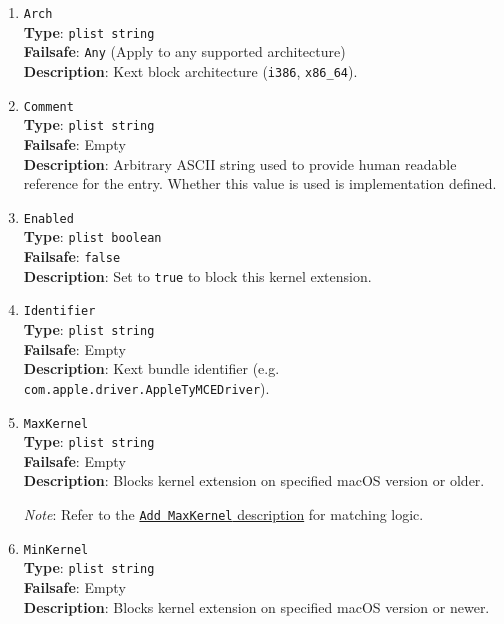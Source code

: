 \documentclass[]{article}
\begin{document}
\begin{enumerate}

\item
  \texttt{Arch}\\
  \textbf{Type}: \texttt{plist\ string}\\
  \textbf{Failsafe}: \texttt{Any} (Apply to any supported architecture)\\
  \textbf{Description}: Kext block architecture (\texttt{i386}, \texttt{x86\_64}).

\item
  \texttt{Comment}\\
  \textbf{Type}: \texttt{plist\ string}\\
  \textbf{Failsafe}: Empty\\
  \textbf{Description}: Arbitrary ASCII string used to provide human readable
  reference for the entry. Whether this value is used is implementation defined.

\item
  \texttt{Enabled}\\
  \textbf{Type}: \texttt{plist\ boolean}\\
  \textbf{Failsafe}: \texttt{false}\\
  \textbf{Description}: Set to \texttt{true} to block this kernel extension.

\item
  \texttt{Identifier}\\
  \textbf{Type}: \texttt{plist\ string}\\
  \textbf{Failsafe}: Empty\\
  \textbf{Description}: Kext bundle identifier
    (e.g. \texttt{com.apple.driver.AppleTyMCEDriver}).

\item
  \texttt{MaxKernel}\\
  \textbf{Type}: \texttt{plist\ string}\\
  \textbf{Failsafe}: Empty\\
  \textbf{Description}: Blocks kernel extension on specified macOS version or older.

  \emph{Note}: Refer to the \hyperlink{kernmatch}{\texttt{Add\ MaxKernel} description} for matching logic.

\item
  \texttt{MinKernel}\\
  \textbf{Type}: \texttt{plist\ string}\\
  \textbf{Failsafe}: Empty\\
  \textbf{Description}: Blocks kernel extension on specified macOS version or newer.


\end{enumerate}
\end{document}
